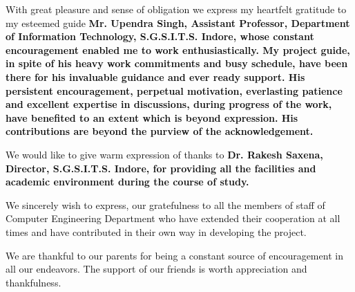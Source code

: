 \documentclass[12pt]{report}
\renewcommand{\_}{\kern-1.5pt\textunderscore\kern-1.5pt}
\begin{document}
\vspace{\baselineskip}

\vspace{\baselineskip}
\begin{adjustwidth}{0.2in}{0.84in}
\textcolor[HTML]{0D0D0D}{With great pleasure and sense of obligation we express my heartfelt gratitude to my esteemed guide \textbf{Mr. Upendra Singh, Assistant Professor, Department of Information Technology, S.G.S.I.T.S. Indore, whose constant encouragement enabled me to work enthusiastically. My project guide, in spite of his heavy work commitments and busy schedule, have been there for his invaluable guidance and ever ready support. His persistent encouragement, perpetual motivation, everlasting patience and excellent expertise in discussions, during progress of the work, have benefited to an extent which is beyond expression. His contributions are beyond the purview of the acknowledgement.}}\par

\end{adjustwidth}

\begin{adjustwidth}{0.2in}{0.84in}
\textcolor[HTML]{0D0D0D}{We would like to give warm expression of thanks to \textbf{Dr. Rakesh Saxena, Director, S.G.S.I.T.S. Indore, for providing all the facilities and academic environment during the course of study.}}\par

\end{adjustwidth}

\begin{adjustwidth}{0.2in}{0.84in}
\textcolor[HTML]{0D0D0D}{We sincerely wish to express, our gratefulness to all the members of staff of Computer Engineering Department who have extended their cooperation at all times and have contributed in their own way in developing the project.}\par

\end{adjustwidth}

\begin{adjustwidth}{0.2in}{0.84in}
\textcolor[HTML]{0D0D0D}{We are thankful to our parents for being a constant source of encouragement in all our endeavors. The support of our friends is worth appreciation and thankfulness.}\par

\end{adjustwidth}


\vspace{\baselineskip}
\end{document}
